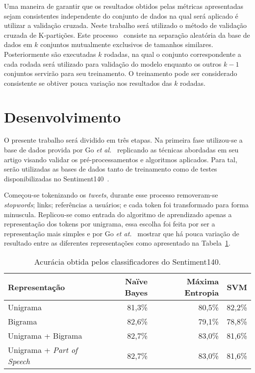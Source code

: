 Uma maneira de garantir que os resultados obtidos pelas métricas apresentadas sejam consistentes independente do
conjunto de dados na qual será aplicado é utilizar a validação cruzada.
Neste trabalho será utilizado o método de validação cruzada de K-partições.
Este processo~\cite{kohavi95} consiste na separação aleatória da base de dados em $k$ conjuntos mutualmente exclusivos
de tamanhos similares.
Posteriormente são executadas $k$ rodadas, na qual o conjunto correspondente a cada rodada será utilizado para validação
do modelo enquanto os outros $k-1$ conjuntos servirão para seu treinamento.
O treinamento pode ser considerado consistente se obtiver pouca variação nos resultados das $k$ rodadas.

\section{Desenvolvimento} \label{sec:desenvolvimento}

O presente trabalho será dividido em três etapas.
Na primeira fase utilizou-se a base de dados provida por Go \textit{et al.}~\cite{go09} replicando as técnicas
abordadas em seu artigo visando validar os pré-processamentos e algoritmos aplicados.
Para tal, serão utilizadas as bases de dados tanto de treinamento como de testes disponibilizadas no
Sentiment140~\cite{go09}.

Começou-se tokenizando os \textit{tweets}, durante esse processo removeram-se \textit{stopwords}; links; referências a usuários;
e cada token foi transformado para forma minuscula.
Replicou-se como entrada do algoritmo de aprendizado apenas a representação dos tokens por unigrama, essa escolha foi
feita por ser a representação mais simples e por Go \textit{et at.}~\cite{go09} mostrar que há pouca variação de
resultado entre as diferentes representações como apresentado na Tabela~\ref{tab:go}.

\begin{table}[h]
    \begin{center}
        \begin{tabular}{| l | r | r | r |}
        \hline
        \textbf{Representação} & \textbf{Naïve Bayes} & \textbf{Máxima Entropia} & \textbf{SVM} \\ \hline
        Unigrama & 81,3\% & 80,5\% & 82,2\% \\ \hline
        Bigrama &  82,6\% & 79,1\% & 78,8\% \\ \hline
        Unigrama + Bigrama & 82,7\% & 83,0\% & 81,6\% \\ \hline
        Unigrama + \textit{Part of Speech} & 82,7\% & 83,0\% & 81,6\% \\ \hline
        \end{tabular}
        \caption{Acurácia obtida pelos classificadores do Sentiment140.}
        \label{tab:go}
    \end{center}
\end{table}

